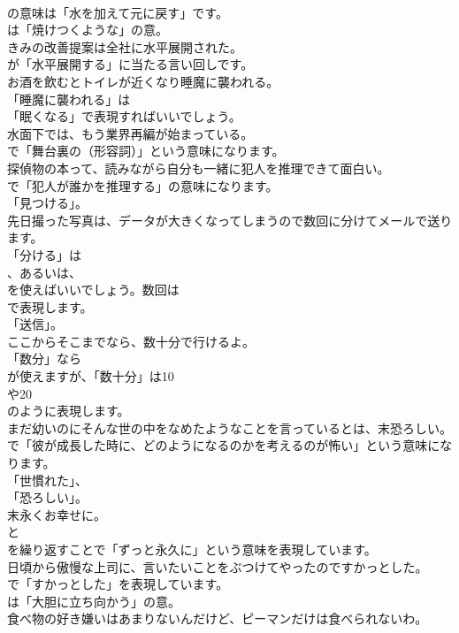 \documentclass[8pt]{extreport}
\begin{document}
\begin{CJK}{UTF8}{min}
\\	の意味は「水を加えて元に戻す」です。
\\	は「焼けつくような」の意。	
\\	きみの改善提案は全社に水平展開された。 
\\	が「水平展開する」に当たる言い回しです。	
\\	お酒を飲むとトイレが近くなり睡魔に襲われる。 
\\	「睡魔に襲われる」は
\\	「眠くなる」で表現すればいいでしょう。	
\\	水面下では、もう業界再編が始まっている。 
\\	で「舞台裏の（形容詞）」という意味になります。	
\\	探偵物の本って、読みながら自分も一緒に犯人を推理できて面白い。 
\\	で「犯人が誰かを推理する」の意味になります。
\\	「見つける」。	
\\	先日撮った写真は、データが大きくなってしまうので数回に分けてメールで送ります。 
\\	「分ける」は
\\	、あるいは、
\\	を使えばいいでしょう。数回は
\\	で表現します。
\\	「送信」。	
\\	ここからそこまでなら、数十分で行けるよ。 
\\	「数分」なら
\\	が使えますが、「数十分」は10 
\\	や20 
\\	のように表現します。	
\\	まだ幼いのにそんな世の中をなめたようなことを言っているとは、末恐ろしい。 
\\	で「彼が成長した時に、どのようになるのかを考えるのが怖い」という意味になります。
\\	「世慣れた」、
\\	「恐ろしい」。	
\\	末永くお幸せに。 
\\	と
\\	を繰り返すことで「ずっと永久に」という意味を表現しています。	
\\	日頃から傲慢な上司に、言いたいことをぶつけてやったのですかっとした。 
\\	で「すかっとした」を表現しています。
\\	は「大胆に立ち向かう」の意。	
\\	食べ物の好き嫌いはあまりないんだけど、ピーマンだけは食べられないわ。 

\end{CJK}
\end{document}
